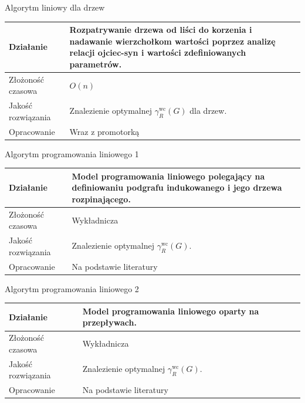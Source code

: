 \documentclass[polish,aspectratio=169]{beamer}
\begin{document}
\begin{frame}{Algorytm liniowy dla drzew}
    \begin{table}
        \centering
        \begin{tabular}{|p{4cm}|p{10cm}|}
        \hline
        Działanie & Rozpatrywanie drzewa od liści do korzenia i nadawanie wierzchołkom wartości poprzez analizę relacji ojciec-syn i wartości zdefiniowanych parametrów. \\
        \hline
        Złożoność czasowa &  $O(n)$  \\
        \hline
        Jakość rozwiązania & Znalezienie optymalnej $\gamma^{\mathrm{wc}}_R(G)$ dla drzew.\\
        \hline
        Opracowanie & Wraz z promotorką  \\
        \hline
        \end{tabular}
        \label{tab:liniowy}
    \end{table}
\end{frame}

\begin{frame}{Algorytm programowania liniowego 1}
    \begin{table}
        \centering
        \begin{tabular}{|p{4cm}|p{10cm}|}
        \hline
        Działanie & Model programowania liniowego polegający na definiowaniu podgrafu indukowanego i jego drzewa rozpinającego.  \\
        \hline
        Złożoność czasowa & Wykładnicza  \\
        \hline
        Jakość rozwiązania & Znalezienie optymalnej $\gamma^{\mathrm{wc}}_R(G)$.\\
        \hline
        Opracowanie & Na podstawie literatury  \\
        \hline
        \end{tabular}
        \label{tab:ilp}
    \end{table}
\end{frame}

\begin{frame}{Algorytm programowania liniowego 2}
    \begin{table}
        \centering
        \begin{tabular}{|p{4cm}|p{10cm}|}
        \hline
        Działanie & Model programowania liniowego oparty na przepływach.  \\
        \hline
        Złożoność czasowa & Wykładnicza  \\
        \hline
        Jakość rozwiązania & Znalezienie optymalnej $\gamma^{\mathrm{wc}}_R(G)$.\\
        \hline
        Opracowanie & Na podstawie literatury  \\
        \hline
        \end{tabular}
        \label{tab:ilp2}
    \end{table}
\end{frame}
\end{document}
